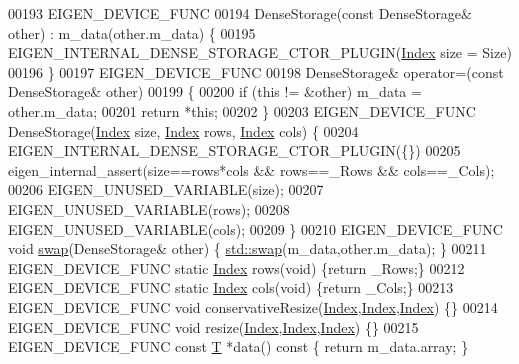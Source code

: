 \begin{DoxyCode}
00193     EIGEN\_DEVICE\_FUNC 
00194     DenseStorage(\textcolor{keyword}{const} DenseStorage& other) : m\_data(other.m\_data) \{
00195       EIGEN\_INTERNAL\_DENSE\_STORAGE\_CTOR\_PLUGIN(\hyperlink{namespace_eigen_a62e77e0933482dafde8fe197d9a2cfde}{Index} size = Size)
00196     \}
00197     EIGEN\_DEVICE\_FUNC 
00198     DenseStorage& operator=(\textcolor{keyword}{const} DenseStorage& other)
00199     \{ 
00200       \textcolor{keywordflow}{if} (\textcolor{keyword}{this} != &other) m\_data = other.m\_data;
00201       \textcolor{keywordflow}{return} *\textcolor{keyword}{this}; 
00202     \}
00203     EIGEN\_DEVICE\_FUNC DenseStorage(\hyperlink{namespace_eigen_a62e77e0933482dafde8fe197d9a2cfde}{Index} size, \hyperlink{namespace_eigen_a62e77e0933482dafde8fe197d9a2cfde}{Index} rows, \hyperlink{namespace_eigen_a62e77e0933482dafde8fe197d9a2cfde}{Index} cols) \{
00204       EIGEN\_INTERNAL\_DENSE\_STORAGE\_CTOR\_PLUGIN(\{\})
00205       eigen\_internal\_assert(size==rows*cols && rows==\_Rows && cols==\_Cols);
00206       EIGEN\_UNUSED\_VARIABLE(size);
00207       EIGEN\_UNUSED\_VARIABLE(rows);
00208       EIGEN\_UNUSED\_VARIABLE(cols);
00209     \}
00210     EIGEN\_DEVICE\_FUNC \textcolor{keywordtype}{void} \hyperlink{endian_8c_a3ca5ecd34b04d6a243c054ac3a57f68d}{swap}(DenseStorage& other) \{ \hyperlink{endian_8c_a3ca5ecd34b04d6a243c054ac3a57f68d}{std::swap}(m\_data,other.m\_data); \}
00211     EIGEN\_DEVICE\_FUNC \textcolor{keyword}{static} \hyperlink{namespace_eigen_a62e77e0933482dafde8fe197d9a2cfde}{Index} rows(\textcolor{keywordtype}{void}) \{\textcolor{keywordflow}{return} \_Rows;\}
00212     EIGEN\_DEVICE\_FUNC \textcolor{keyword}{static} \hyperlink{namespace_eigen_a62e77e0933482dafde8fe197d9a2cfde}{Index} cols(\textcolor{keywordtype}{void}) \{\textcolor{keywordflow}{return} \_Cols;\}
00213     EIGEN\_DEVICE\_FUNC \textcolor{keywordtype}{void} conservativeResize(\hyperlink{namespace_eigen_a62e77e0933482dafde8fe197d9a2cfde}{Index},\hyperlink{namespace_eigen_a62e77e0933482dafde8fe197d9a2cfde}{Index},\hyperlink{namespace_eigen_a62e77e0933482dafde8fe197d9a2cfde}{Index}) \{\}
00214     EIGEN\_DEVICE\_FUNC \textcolor{keywordtype}{void} resize(\hyperlink{namespace_eigen_a62e77e0933482dafde8fe197d9a2cfde}{Index},\hyperlink{namespace_eigen_a62e77e0933482dafde8fe197d9a2cfde}{Index},\hyperlink{namespace_eigen_a62e77e0933482dafde8fe197d9a2cfde}{Index}) \{\}
00215     EIGEN\_DEVICE\_FUNC \textcolor{keyword}{const} \hyperlink{group___sparse_core___module_class_eigen_1_1_triplet}{T} *data()\textcolor{keyword}{ const }\{ \textcolor{keywordflow}{return} m\_data.array; \}

\end{DoxyCode}
